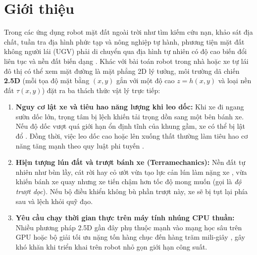 \documentclass[12pt, a4paper]{article}
\begin{document}
\section{Giới thiệu}
Trong các ứng dụng robot mặt đất ngoài trời như tìm kiếm cứu nạn, khảo sát địa chất, tuần tra địa hình phức tạp và nông nghiệp tự hành, phương tiện mặt đất không người lái (UGV) phải di chuyển qua địa hình tự nhiên có độ cao biến đổi liên tục và nền đất biến dạng \cite{liu2023}. Khác với bài toán robot trong nhà hoặc xe tự lái đô thị có thể xem mặt đường là mặt phẳng 2D lý tưởng, môi trường dã chiến \textbf{2.5D} (mỗi tọa độ mặt bằng $(x,y)$ gắn với một độ cao $z = h(x,y)$ và loại nền đất $\tau(x,y)$) đặt ra ba thách thức vật lý trực tiếp:
\begin{enumerate}
    \item \textbf{Nguy cơ lật xe và tiêu hao năng lượng khi leo dốc:} Khi xe đi ngang sườn dốc lớn, trọng tâm bị lệch khiến tải trọng dồn sang một bên bánh xe. Nếu độ dốc vượt quá giới hạn ổn định tĩnh của khung gầm, xe có thể bị lật đổ \cite{chen2012ltr}. Đồng thời, việc leo dốc cao hoặc lên xuống thất thường làm tiêu hao cơ năng tăng mạnh theo quy luật phi tuyến \cite{minetti2002}.
    \item \textbf{Hiện tượng lún đất và trượt bánh xe (Terramechanics):} Nền đất tự nhiên như bùn lầy, cát rời hay cỏ ướt vừa tạo lực cản lún làm nặng xe \cite{bekker1956, wong2008}, vừa khiến bánh xe quay nhưng xe tiến chậm hơn tốc độ mong muốn (gọi là \textit{độ trượt dọc}). Nếu bộ điều khiển không bù phần trượt này, xe sẽ bị tụt lại phía sau và lệch khỏi quỹ đạo.
    \item \textbf{Yêu cầu chạy thời gian thực trên máy tính nhúng CPU thuần:} Nhiều phương pháp 2.5D gần đây phụ thuộc mạnh vào mạng học sâu trên GPU hoặc bộ giải tối ưu nặng tốn hàng chục đến hàng trăm mili-giây \cite{wellhausen2023art, grandia2023}, gây khó khăn khi triển khai trên robot nhỏ gọn giới hạn công suất.
\end{enumerate}
\end{document}
